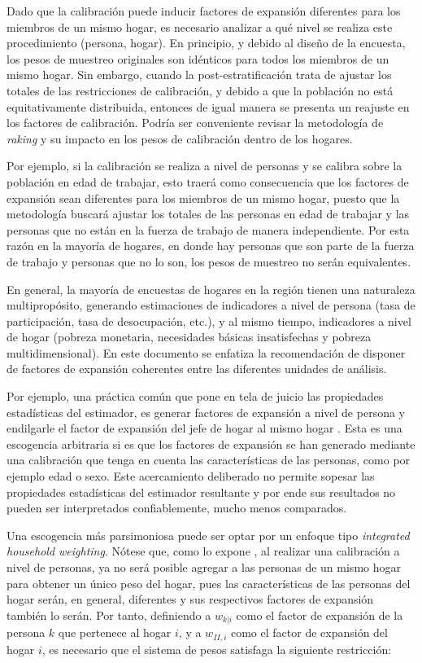 \documentclass[
  12pt,
]{book}
\begin{document}
Dado que la calibración puede inducir factores de expansión diferentes para los miembros de un mismo hogar, es necesario analizar a qué nivel se realiza este procedimiento (persona, hogar). En principio, y debido al diseño de la encuesta, los pesos de muestreo originales son idénticos para todos los miembros de un mismo hogar. Sin embargo, cuando la post-estratificación trata de ajustar los totales de las restricciones de calibración, y debido a que la población no está equitativamente distribuida, entonces de igual manera se presenta un reajuste en los factores de calibración. Podría ser conveniente revisar la metodología de \emph{raking} y su impacto en los pesos de calibración dentro de los hogares.

Por ejemplo, si la calibración se realiza a nivel de personas y se calibra sobre la población en edad de trabajar, esto traerá como consecuencia que los factores de expansión sean diferentes para los miembros de un mismo hogar, puesto que la metodología buscará ajustar los totales de las personas en edad de trabajar y las personas que no están en la fuerza de trabajo de manera independiente. Por esta razón en la mayoría de hogares, en donde hay personas que son parte de la fuerza de trabajo y personas que no lo son, los pesos de muestreo no serán equivalentes.

En general, la mayoría de encuestas de hogares en la región tienen una naturaleza multipropósito, generando estimaciones de indicadores a nivel de persona (tasa de participación, tasa de desocupación, etc.), y al mismo tiempo, indicadores a nivel de hogar (pobreza monetaria, necesidades básicas insatisfechas y pobreza multidimensional). En este documento se enfatiza la recomendación de disponer de factores de expansión coherentes entre las diferentes unidades de análisis.

Por ejemplo, una práctica común que pone en tela de juicio las propiedades estadísticas del estimador, es generar factores de expansión a nivel de persona y endilgarle el factor de expansión del jefe de hogar al mismo hogar \citep{Alexander_1987}. Esta es una escogencia arbitraria si es que los factores de expansión se han generado mediante una calibración que tenga en cuenta las características de las personas, como por ejemplo edad o sexo. Este acercamiento deliberado no permite sopesar las propiedades estadísticas del estimador resultante y por ende sus resultados no pueden ser interpretados confiablemente, mucho menos comparados.

Una escogencia más parsimoniosa puede ser optar por un enfoque tipo \emph{integrated household weighting}. Nótese que, como lo expone \citet{Heldal_1992}, al realizar una calibración a nivel de personas, ya no será posible agregar a las personas de un mismo hogar para obtener un único peso del hogar, pues las características de las personas del hogar serán, en general, diferentes y sus respectivos factores de expansión también lo serán. Por tanto, definiendo a \(w_{k|i}\) como el factor de expansión de la persona \(k\) que pertenece al hogar \(i\), y a \(w_{II,i}\) como el factor de expansión del hogar \(i\), es necesario que el sistema de pesos satisfaga la siguiente restricción:
\end{document}
